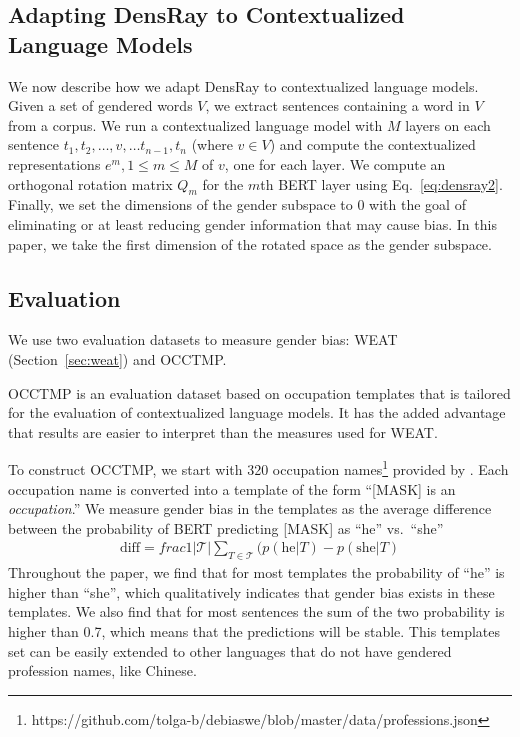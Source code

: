 \subsection{Adapting DensRay to Contextualized Language Models}
We now describe how we adapt DensRay to contextualized
language models. Given a set of gendered words
$V$, we extract sentences containing a word in $V$ from a
corpus. We run a contextualized language model
with $M$ layers
on each
sentence
$t_1,t_2,\ldots,v,\ldots t_{n-1},t_n$ (where $v \in V$)
and compute the contextualized representations $e^m, 1\leq m
\leq M$ of $v$, one for each layer. 
We compute an orthogonal rotation
matrix $Q_m$ for the $m$th BERT layer using Eq.\
\ref{eq:densray2}.
Finally, we set the dimensions
of the gender subspace to $0$ with the goal of eliminating
or at least reducing
gender
information that may cause bias. In this
paper, we take the first dimension of the rotated space as
the gender subspace.

\subsection{Evaluation}\label{sec:eval}
We use two evaluation datasets
to measure gender
bias: WEAT (Section~\ref{sec:weat}) and OCCTMP.

OCCTMP is an evaluation dataset
based on occupation templates
that
is tailored for 
the evaluation of contextualized language models.  It has
the added advantage that results are easier to interpret
than the measures used for WEAT.

To construct OCCTMP,
we start with 
320 occupation
names\footnote{https://github.com/tolga-b/debiaswe/blob/master/data/professions.json}
provided by \citet{bolukbasi2016man}.
Each occupation name is converted into a template of the form
``[MASK] is an \textit{occupation}.''
We measure
gender bias
in the templates as the average difference
between the probability of BERT predicting [MASK] as ``he''
vs.\ ``she''
\begin{eqnarray}
    \text{diff}=frac{1}{|{\mathcal T}|} \sum_{T \in
      {\mathcal T}}(p(\mbox{he}| T) - p(\mbox{she}|T)\nonumber
\end{eqnarray}
Throughout the paper, we find that for most templates the probability of ``he'' is higher than ``she'', which qualitatively indicates that gender bias exists in these templates. We also find that for most sentences the sum of the two probability is higher than 0.7, which means that the predictions will be stable. This templates set can be easily extended to other languages that do not have gendered profession names, like Chinese.
